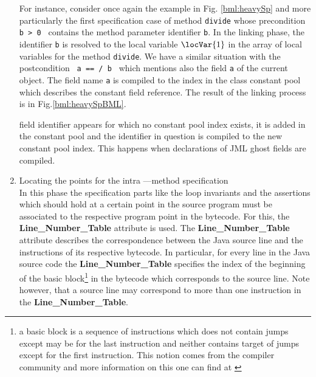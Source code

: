 \begin{enumerate}
      For instance, consider once again the example in
      Fig. \ref{bml:heavySp} and more particularly the first
      specification case of method \texttt{divide} whose precondition
      \texttt{ b > 0 } contains the method parameter identifier
      \texttt{b}.  In the linking phase, the identifier \texttt{b} is
      resolved to the local variable $\locVar{1}$ in the array of
      local variables for the method \texttt{divide}.  We have a
      similar situation with the postcondition \texttt{ a ==  /
      b } which mentions also the field \texttt{a} of the current
      object.  The field name \texttt{a} is compiled to the index in
      the class constant pool which describes the constant field
      reference.  The result of the linking process is in
      Fig.\ref{bml:heavySpBML}.

      field identifier appears for which no constant pool index
      exists, it is added in the constant pool and the identifier in
      question is compiled to the new constant pool index. This
      happens when declarations of JML ghost fields are compiled.
     

  





      

\item Locating the points for the intra ---method specification \\

      In this phase the specification parts like the loop invariants
      and the assertions which should hold at a certain point in the
      source program must be associated to the respective program
      point in the bytecode. For this, the
      \textbf{Line\_Number\_Table} attribute is used. The
      \textbf{Line\_Number\_Table} attribute describes the
      correspondence between the Java source line and the instructions
      of its respective bytecode.  In particular, for every line in
      the Java source code the \textbf{Line\_Number\_Table} specifies
      the index of the beginning of the basic block\footnote{a basic
      block is a sequence of instructions which does not contain jumps
      except may be for the last instruction and neither contains
      target of jumps except for the first instruction. This notion
      comes from the compiler community and more information on this
      one can find at \cite{ARUCom1986}} in the bytecode which
      corresponds to the source line. Note however, that a source line
      may correspond to more than one instruction in the
      \textbf{Line\_Number\_Table}.
     

\end{enumerate}
